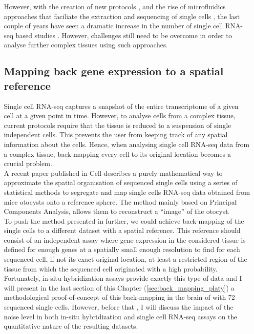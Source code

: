 	However, with the creation of new protocols \cite{ramskold12,tang09}, and the rise of microfluidics approaches that faciliate the extraction and sequencing of single cells \cite{ozsolak10}, the last couple of years have seen a dramatic increase in the number of single cell RNA-seq based studies \cite{islam13,marinov13,yan13,staahlberg13,deng14}. However, challenges still need to be overcome in order to analyse further complex tissues using such approaches.

  \subsection{Mapping back gene expression to a spatial reference}

	Single cell RNA-seq captures a snapshot of the entire transcriptome of a given cell at a given point in time. However, to analyse cells from a complex tissue, current protocols require that the tissue is reduced to a suspension of single independent cells. This prevents the user from keeping track of any spatial information about the cells. Hence, when analysing single cell RNA-seq data from a complex tissue, back-mapping every cell to its original location becomes a crucial problem.\\ 
	
	A recent paper published in Cell \cite{durruthy14} describes a purely mathematical way to approximate the spatial organisation of sequenced single cells using a series of statistical methods to segregate and map single cells RNA-seq data obtained from mice otocysts onto a reference sphere. The method mainly based on Principal Components Analysis, allows them to reconstruct a ``image'' of the otocyst.\\
	
	To push the method presented in \cite{durruthy14} further, we could achieve back-mapping of the single cells to a different dataset with a spatial reference. This reference should consist of an independent assay where gene expression in the considered tissue is defined for enough genes at a spatially small enough resolution to find for each sequenced cell, if not its exact original location, at least a restricted region of the tissue from which the sequenced cell originated with a high probability.\\
	
	Fortunately, in-situ hybridization assays provide exactly this type of data and I will present in the last section of this Chapter (\ref{sec:back_mapping_platy}) a methodological proof-of-concept of this back-mapping in the brain of \platy{} with 72 sequenced single cells. However, before that , I will discuss the impact of the noise level in both in-situ hybridization and single cell RNA-seq assays on the quantitative nature of the resulting datasets.

